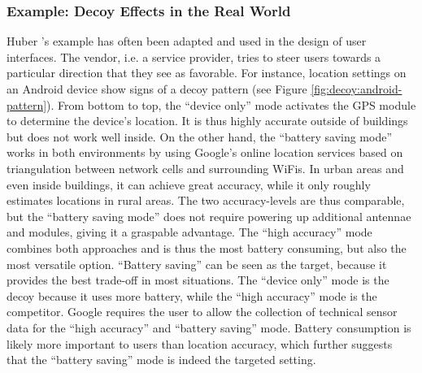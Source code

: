\subsubsection{Example: Decoy Effects in the Real World}
Huber \etal's example has often been adapted and used in the design of user interfaces. The vendor, i.e. a service provider, tries to steer users towards a particular direction that they see as favorable. For instance, location settings on an Android device show signs of a decoy pattern (see Figure \ref{fig:decoy:android-pattern}). From bottom to top, the ``device only'' mode activates the GPS module to determine the device's location. It is thus highly accurate outside of buildings but does not work well inside. On the other hand, the ``battery saving mode'' works in both environments by using Google's online location services based on triangulation between network cells and surrounding WiFis. In urban areas and even inside buildings, it can achieve great accuracy, while it only roughly estimates locations in rural areas. The two accuracy-levels are thus comparable, but the ``battery saving mode'' does not require powering up additional antennae and modules, giving it a graspable advantage. The ``high accuracy'' mode combines both approaches and is thus the most battery consuming, but also the most versatile option. ``Battery saving'' can be seen as the target, because it provides the best trade-off in most situations. The ``device only'' mode is the decoy because it uses more battery, while the ``high accuracy'' mode is the competitor. Google requires the user to allow the collection of technical sensor data for the ``high accuracy'' and ``battery saving'' mode. Battery consumption is likely more important to users than location accuracy, which further suggests that the ``battery saving'' mode is indeed the targeted setting. 

